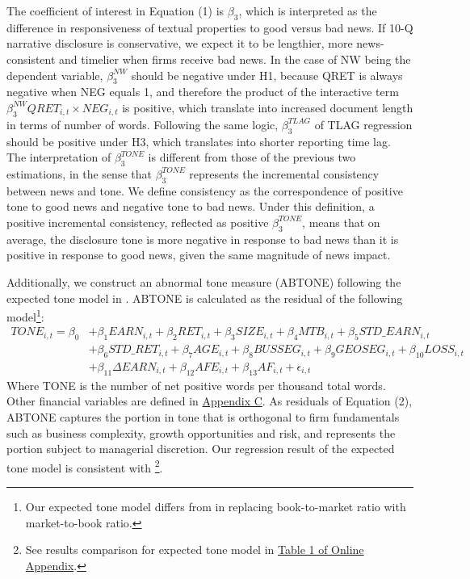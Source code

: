 \documentclass[a4paper]{article}
\begin{document}
\begin{spacing}{2}
The coefficient of interest in Equation (1) is $\beta_3$, which is interpreted as the difference in responsiveness of textual properties to good versus bad news. If 10-Q narrative disclosure is conservative, we expect it to be lengthier, more news-consistent and timelier when firms receive bad news. In the case of NW being the dependent variable, $\beta_3^{NW}$ should be negative under H1, because QRET is always negative when NEG equals 1, and therefore the product of the interactive term $\beta_3^{NW}QRET_{i,t}\times NEG_{i,t}$ is positive, which translate into increased document length in terms of number of words. Following the same logic, $\beta_3^{TLAG}$ of TLAG regression should be positive under H3, which translates into shorter reporting time lag. The interpretation of $\beta_3^{TONE}$ is different from those of the previous two estimations, in the sense that $\beta_3^{TONE}$ represents the incremental consistency between news and tone. We define consistency as the correspondence of positive tone to good news and negative tone to bad news. Under this definition, a positive incremental consistency, reflected as positive $\beta_3^{TONE}$, means that on average, the disclosure tone is more negative in response to bad news than it is positive in response to good news, given the same magnitude of news impact.

Additionally, we construct an abnormal tone measure (ABTONE) following the expected tone model in \citet{huangToneManagement2014}. ABTONE is calculated as the residual of the following model\footnote{Our expected tone model differs from \citet{huangToneManagement2014} in replacing book-to-market ratio with market-to-book ratio.}:
\begin{equation} \label{eq2}
\begin{split}
TONE_{i,t}=\beta_0&+\beta_1EARN_{i,t}+\beta_2RET_{i,t}+\beta_3SIZE_{i,t}+\beta_4MTB_{i,t}+\beta_5STD\_EARN_{i,t}\\
&+\beta_6STD\_RET_{i,t}+\beta_7AGE_{i,t}+\beta_8BUSSEG_{i,t}+\beta_9GEOSEG_{i,t}+\beta_{10}LOSS_{i,t}\\
&+\beta_{11}\Delta EARN_{i,t}+\beta_{12}AFE_{i,t}+\beta_{13}AF_{i,t}+\epsilon_{i,t}
\end{split}
\end{equation}
Where TONE is the number of net positive words per thousand total words. Other financial variables are defined in \hyperref[appc]{Appendix C}. As residuals of Equation (2), ABTONE captures the portion in tone that is orthogonal to firm fundamentals such as business complexity, growth opportunities and risk, and represents the portion subject to managerial discretion. Our regression result of the expected tone model is consistent with \citet{huangToneManagement2014}\footnote{See results comparison for expected tone model in \hyperref[oat1]{Table 1 of Online Appendix}.}.


\end{spacing}
\end{document}
